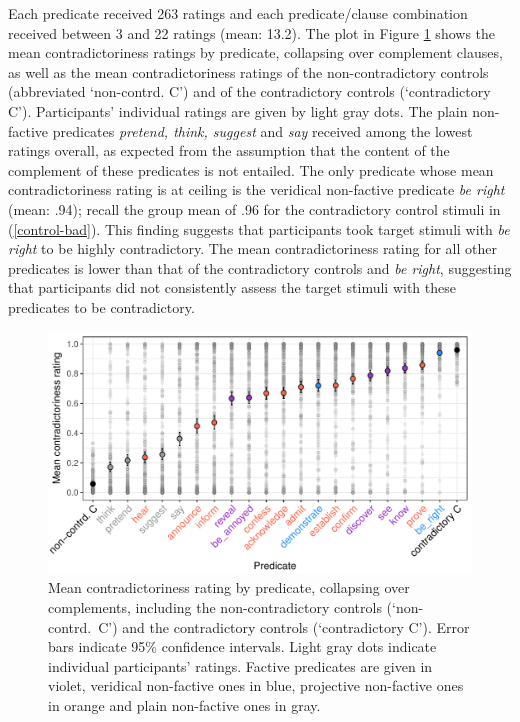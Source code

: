 \documentclass[11pt,fleqn]{article}
\newcommand{\6}{\mbox{$[\hspace*{-.6mm}[$}}
\newcommand{\9}{\mbox{$]\hspace*{-.6mm}]$}}
\begin{document}
{Each predicate received 263 ratings and each predicate/clause combination received between 3 and 22 ratings (mean: 13.2). The plot in Figure \ref{f-veridicality-predicate2} shows the mean contradictoriness ratings by predicate, collapsing over complement clauses, as well as the mean contradictoriness ratings of the non-contradictory controls (abbreviated `non-contrd. C')  and of the contradictory controls (`contradictory C'). Participants' individual ratings are given by light gray dots. The plain non-factive predicates {\em pretend, think, suggest} and {\em say} received among the lowest ratings overall, as expected from the assumption that the content of the complement of these predicates is not entailed. The only predicate whose mean  contradictoriness rating is at ceiling is the veridical non-factive predicate {\em be right} (mean: .94); recall the group mean of .96 for the contradictory control stimuli in (\ref{control-bad}). This finding suggests that participants took target stimuli with {\em be right} to be highly contradictory. The mean contradictoriness rating for all other predicates is lower than that of the contradictory controls and {\em be right}, suggesting that participants did not consistently assess the target stimuli with these predicates to be contradictory. 

\begin{figure}[h!]
\centering

\includegraphics[width=.7\paperwidth]{../results/2-veridicality2/graphs/means-contradictoriness-by-predicate-variability}

\caption{Mean contradictoriness rating by predicate, collapsing over complements, including the non-contradictory controls (`non-contrd.\ C') and the contradictory controls (`contradictory C'). Error bars indicate 95\% confidence intervals. Light gray dots indicate individual participants' ratings. Factive predicates are given in violet, veridical non-factive ones in blue, projective non-factive ones in orange and plain non-factive ones in gray.}
\label{f-veridicality-predicate2}
\end{figure}

}
\end{document}
